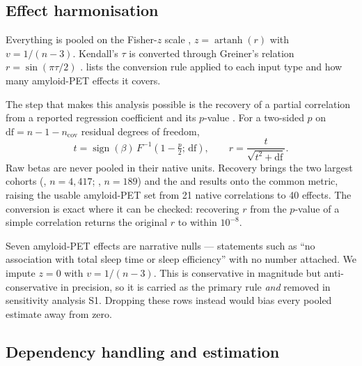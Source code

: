 \subsection{Effect harmonisation}
\label{sec:harmonise}

Everything is pooled on the Fisher-$z$ scale \citep{fisher1915},
$z = \operatorname{artanh}(r)$ with $v = 1/(n-3)$. Kendall's $\tau$ is converted through
Greiner's relation $r = \sin(\pi\tau/2)$ \citep{kendall1949}.  lists the conversion rule applied to each input type and
how many amyloid-PET effects it covers.



 The step that makes this analysis possible is the recovery of a
partial correlation from a reported regression coefficient and its $p$-value
\citep{rosenthal1979}. For a two-sided $p$ on $\mathrm{df} = n - 1 - n_{\mathrm{cov}}$ residual
degrees of freedom,
\begin{equation}
t = \operatorname{sign}(\beta)\, F^{-1}\!\left(1 - \tfrac{p}{2};\, \mathrm{df}\right),
\qquad
r = \frac{t}{\sqrt{t^{2} + \mathrm{df}}}.
\label{eq:recovery}
\end{equation}
Raw betas are never pooled in their native units. Recovery brings the two largest cohorts
(\afour, $n = 4{,}417$; \aibl, $n = 189$) and the \mayo and \mars results onto the common
metric, raising the usable amyloid-PET set from 21 native correlations to 40 effects. The
conversion is exact where it can be checked: recovering $r$ from the $p$-value of a simple
correlation returns the original $r$ to within $10^{-8}$.

 Seven amyloid-PET effects are narrative nulls --- statements such as ``no
association with total sleep time or sleep efficiency'' with no number attached. We impute
$z = 0$ with $v = 1/(n-3)$. This is conservative in magnitude but anti-conservative in
precision, so it is carried as the primary rule \emph{and} removed in sensitivity analysis S1.
Dropping these rows instead would bias every pooled estimate away from zero.

\subsection{Dependency handling and estimation}
\label{sec:estimation}

